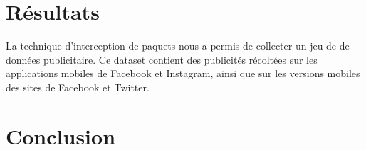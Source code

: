 \documentclass[runningheads]{llncs}
\begin{document}
\section{Résultats}\label{analyse_dataset}

La technique d'interception de paquets nous a permis de collecter un jeu de de données publicitaire. Ce dataset contient des publicités récoltées sur les applications mobiles de Facebook et Instagram, ainsi que sur les versions mobiles des sites de Facebook et Twitter.


\section{Conclusion}\label{conclusion}

\iffalse
Figure décrivant les différentes étapes
\fi




\end{document}
